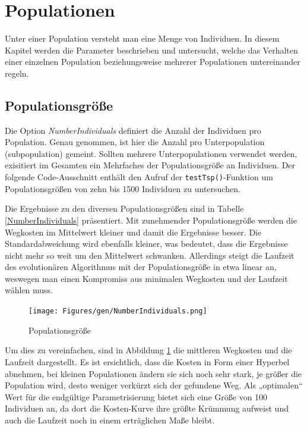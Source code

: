 \section{Populationen}\label{populations}


Unter einer Population versteht man eine Menge von Individuen. In diesem Kapitel
werden die Parameter beschrieben und untersucht, welche das Verhalten einer
einzelnen Population beziehungsweise mehrerer Populationen untereinander regeln.

\subsection{Populationsgröße}
Die Option \emph{NumberIndividuals} definiert die Anzahl der Individuen
pro Population. Genau genommen, ist hier die Anzahl pro Unterpopulation
(subpopulation) gemeint. Sollten mehrere Unterpopulationen verwendet werden,
exisitiert im Gesamten ein Mehrfaches der Populationsgröße an Individuen.
Der folgende Code-Ausschnitt enthält den Aufruf der {\tt testTsp()}-Funktion um
Populationsgrößen von zehn bis 1500 Individuen zu untersuchen.





\noindent Die Ergebnisse zu den diversen Populationsgrößen sind in Tabelle
\ref{NumberIndividuals} präsentiert. Mit zunehmender Populationsgröße werden die
Wegkosten im Mittelwert kleiner und damit die Ergebnisse besser.
Die Standardabweichung wird ebenfalls kleiner, was bedeutet, dass die Ergebnisse
nicht mehr so weit um den Mittelwert schwanken. Allerdings steigt die Laufzeit
des evolutionären Algorithmus mit der Populationsgröße in etwa linear an,
weswegen man einen Kompromiss aus minimalen Wegkosten und der Laufzeit wählen
muss.

\begin{figure}[h!]
  \centering
  \texttt{[image: Figures/gen/NumberIndividuals.png]}
  \caption{Populationsgröße}\label{fig.numberindividuals}
\end{figure}

Um dies zu vereinfachen, sind in Abbildung \ref{fig.numberindividuals} die
mittleren Wegkosten und die Laufzeit dargestellt. Es ist ersichtlich, dass die
Kosten in Form einer Hyperbel abnehmen, bei kleinen Populationen ändern sie sich
noch sehr stark, je größer die Population wird, desto weniger verkürzt sich der
gefundene Weg. Als „optimalen“ Wert für die endgültige Parametrisierung bietet
sich eine Größe von 100 Individuen an, da dort die Kosten-Kurve ihre größte
Krümmung aufweist und auch die Laufzeit noch in einem erträglichen Maße bleibt.


